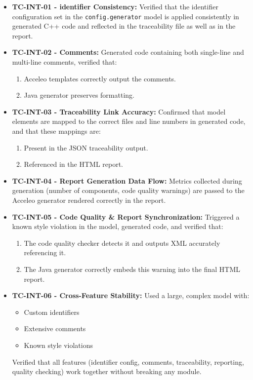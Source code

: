 \begin{itemize}
	\item \textbf{TC-INT-01 - \Gls{identifier} Consistency:} Verified that the \gls{identifier} configuration set in the \texttt{config.generator} model is applied consistently in generated C++ code and reflected in the traceability file as well as in the report.
	
	\item \textbf{TC-INT-02 - Comments:} Generated code containing both single-line and multi-line comments, verified that:
	\begin{enumerate}
		\item Acceleo templates correctly output the comments.
		\item Java generator preserves formatting.
	\end{enumerate}
	
	\item \textbf{TC-INT-03 - Traceability Link Accuracy:} Confirmed that model elements are mapped to the correct files and line numbers in generated code, and that these mappings are:
	\begin{enumerate}
		\item Present in the \gls{JSON} traceability output.
		\item Referenced in the \gls{HTML} report.
	\end{enumerate}
	
	\item \textbf{TC-INT-04 - Report Generation Data Flow:} Metrics collected during generation (number of components, code quality warnings) are passed to the Acceleo generator rendered correctly in the report.
	
	\item \textbf{TC-INT-05 - Code Quality \& Report Synchronization:} Triggered a known style violation in the model, generated code, and verified that:
	\begin{enumerate}
		\item The code quality checker detects it and outputs XML accurately referencing it.
		\item The Java generator correctly embeds this warning into the final HTML report.
	\end{enumerate}
	
	\item \textbf{TC-INT-06 - Cross-Feature Stability:} Used a large, complex model with:
	\begin{itemize}
		\item Custom \glspl{identifier}
		\item Extensive comments
		\item Known style violations
	\end{itemize}
	Verified that all features (\gls{identifier} config, comments, traceability, reporting, quality checking) work together without breaking any module.
\end{itemize}



